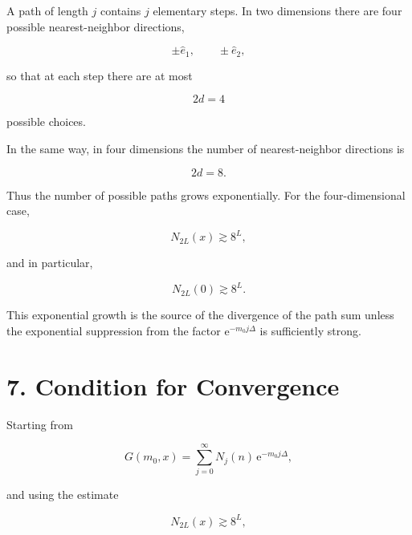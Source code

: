 \documentclass[12pt,a4paper]{article}
\newcommand{\ee}{\mathrm{e}}
\begin{document}
A path of length $j$ contains $j$ elementary steps. In two
dimensions there are four possible nearest-neighbor directions,

\begin{equation}
    \pm\hat e_1,
    \qquad
    \pm\hat e_2,
\end{equation}

so that at each step there are at most

\begin{equation}
    2d=4
\end{equation}

possible choices.

In the same way, in four dimensions the number of nearest-neighbor
directions is

\begin{equation}
    2d=8.
\end{equation}

Thus the number of possible paths grows exponentially. For the
four-dimensional case,

\begin{equation}
    N_{2L}(x)\gtrsim 8^L,
\end{equation}

and in particular,

\begin{equation}
    N_{2L}(0)\gtrsim 8^L.
\end{equation}

This exponential growth is the source of the divergence of the
path sum unless the exponential suppression from the factor
$\ee^{-m_0j\Delta}$ is sufficiently strong.


\section*{7. Condition for Convergence}

Starting from

\begin{equation}
    G(m_0,x)
    =
    \sum_{j=0}^{\infty}
    N_j(n)\,
    \ee^{-m_0j\Delta},
\end{equation}

and using the estimate

\begin{equation}
    N_{2L}(x)\gtrsim 8^L,
\end{equation}
\end{document}
